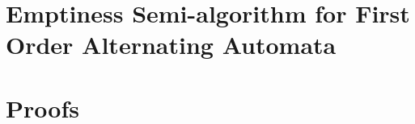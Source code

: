 \section{Emptiness Semi-algorithm for First Order Alternating Automata}
\label{app:algorithm}

\section{Proofs}
\label{app:proofs}
